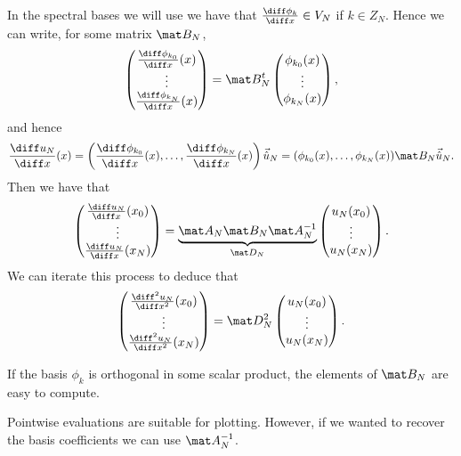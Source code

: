 In the spectral bases we will use we have that $\frac{\diff \phi_k}{\diff x} \in V_N$ if $k \in Z_N$. Hence we can write, for some matrix $\mat B_N$,
\begin{equation*}
    \begin{pmatrix}
        \frac{\diff \phi_{k_0}}{\diff x} (x)
        \\
        \vdots \\
        \frac{\diff \phi_{k_N}}{\diff x} (x)
    \end{pmatrix}
    = \mat B_N^t
    \begin{pmatrix}
        \phi_{k_0} (x) \\ \vdots \\ \phi_{k_N}(x)
    \end{pmatrix},
\end{equation*}
and hence
\begin{equation*}
    \frac{\diff u_N}{\diff x} (x)
    =  \left(\frac{\diff \phi_{k_0}}{\diff x} (x), \dots, \frac{\diff \phi_{k_N}}{\diff x} (x)\right)
    \vec{\hat u}_N
    = (\phi_{k_0} (x), \dots, \phi_{k_N}(x)) \mat B_N \vec {\hat u}_N.
\end{equation*}
Then we have that
\begin{equation*}
    \begin{pmatrix}
        \frac{\diff u_N}{\diff x}(x_0) \\ \vdots \\ \frac{\diff u_N}{\diff x} (x_N)
    \end{pmatrix}
    =
    \underbrace{\mat A_N \mat B_N \mat A_N^{-1}}_{\mat D_N}
    \begin{pmatrix}
        u_N(x_0) \\ \vdots \\ u_N(x_N)
    \end{pmatrix}.
\end{equation*}
We can iterate this process to deduce that
\begin{equation*}
    \begin{pmatrix}
        \frac{\diff^2 u_N}{\diff x^2}(x_0) \\ \vdots \\ \frac{\diff^2 u_N}{\diff x^2} (x_N)
    \end{pmatrix}
    =
    \mat D_N^2
    \begin{pmatrix}
        u_N(x_0) \\ \vdots \\ u_N(x_N)
    \end{pmatrix}.
\end{equation*}


If the basis $\phi_k$ is orthogonal in some scalar product, the elements of $\mat B_N$ are easy to compute.


\begin{remark}
    \label{rem:pointwise evaluation plotting}
    Pointwise evaluations are suitable for plotting. However, if we wanted to recover the basis coefficients we can use $\mat A_N^{-1}$.
\end{remark}

\printbibliography[heading=subbibliography]
